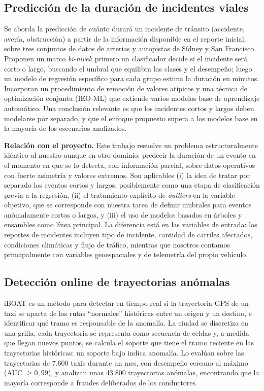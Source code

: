 \documentclass[12pt, a4paper]{article}
\begin{document}
\subsection{Predicción de la duración de incidentes viales
  \cite{grigorev2022}}

Se aborda la predicción de cuánto durará un
incidente de tránsito (accidente, avería, obstrucción) a partir de la
información disponible en el reporte inicial, sobre tres conjuntos de datos
de arterias y autopistas de Sídney y San Francisco. Proponen un marco
\emph{bi-nivel}: primero un clasificador decide si el incidente será corto o
largo, buscando el umbral que equilibra las clases y el desempeño; luego un
modelo de regresión específico para cada grupo estima la duración en minutos.
Incorporan un procedimiento de remoción de valores atípicos y una técnica de
optimización conjunta (IEO-ML) que extiende varios modelos base de aprendizaje
automático. Una conclusión relevante es que los incidentes cortos y largos
deben modelarse por separado, y que el enfoque propuesto supera a los modelos
base en la mayoría de los escenarios analizados.

\textbf{Relación con el proyecto.} Este trabajo resuelve un problema
estructuralmente idéntico al nuestro aunque en otro dominio: predecir la
duración de un evento en el momento en que se lo detecta, con información
parcial, sobre datos operativos con fuerte asimetría y valores extremos. Son
aplicables (i) la idea de tratar por separado los eventos cortos y largos,
posiblemente como una etapa de clasificación previa a la regresión, (ii) el
tratamiento explícito de \emph{outliers} en la variable objetivo, que se
corresponde con nuestra tarea de definir umbrales para eventos anómalamente
cortos o largos, y (iii) el uso de modelos basados en árboles y ensambles como
línea principal. La diferencia está en las variables de entrada: los reportes
de incidentes incluyen tipo de incidente, cantidad de carriles afectados,
condiciones climáticas y flujo de tráfico, mientras que nosotros contamos
principalmente con variables geoespaciales y de telemetría del propio
vehículo.

\subsection{Detección online de trayectorias anómalas
  \cite{chen2013}}

iBOAT es un método para detectar en tiempo real si
la trayectoria GPS de un taxi se aparta de las rutas ``normales'' históricas
entre un origen y un destino, e identificar qué tramo es responsable de la
anomalía. La ciudad se discretiza en una grilla, cada trayectoria se
representa como secuencia de celdas y, a medida que llegan nuevos puntos, se
calcula el soporte que tiene el tramo reciente en las trayectorias históricas:
un soporte bajo indica anomalía. Lo evalúan sobre las trayectorias de 7.600
taxis durante un mes, con desempeño cercano al máximo (AUC $\ge 0{,}99$), y
analizan unas 43.800 trayectorias anómalas, encontrando que la mayoría
corresponde a fraudes deliberados de los conductores.
\end{document}
